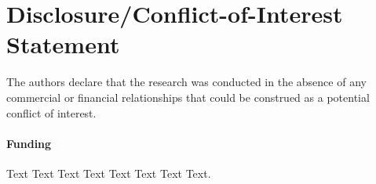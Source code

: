 \documentclass{frontiersSCNS} %
\begin{document}
\section*{Disclosure/Conflict-of-Interest Statement}
The authors declare that the research was conducted in the absence of any
commercial or financial relationships that could be construed as a potential
conflict of interest.

\paragraph{Funding\textcolon} Text Text Text Text Text Text  Text Text.


\end{document}
